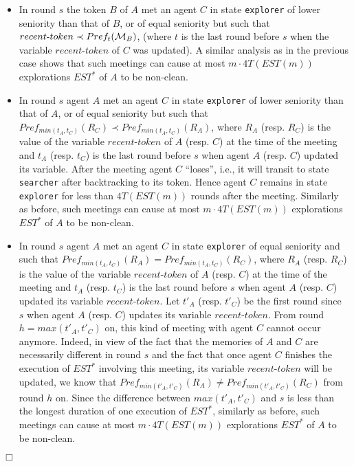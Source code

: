 \documentclass[11pt]{article}
\newcommand{\qed}{\hfill $\Box$ \bigbreak}
\newenvironment{proof}{\noindent {\bf Proof.}}{\qed}
\newcommand{\cM}{{\cal M}}
\begin{document}
\begin{proof}
\begin{itemize}
   
     \item
     {In round $s$} the token $B$ of $A$ met an agent $C$  in state {\tt explorer} of lower seniority than that of $B$, or of equal seniority but such that $recent\mbox{-}token \prec Pref_t(\cM_B)$, {(where $t$ is the last round before $s$ when the variable $recent$-$token$ of $C$ was updated)}.
     A similar analysis as in the previous case shows that such meetings {can cause at most $m \cdot 4T(EST(m))$ explorations $EST^*$ of $A$ to be non-clean.}  
     \item
    {In round $s$ agent $A$ met an agent $C$ in state {\tt explorer} of lower seniority than that of $A$, or of equal seniority but such that $Pref_{min(t_A,t_C)}(R_C) \prec Pref_{min(t_A,t_C)}(R_A)$, where $R_A$ (resp. $R_C$) is the value of the variable $recent$-$token$ of $A$ (resp. $C$) at the time of the meeting and $t_A$ (resp. $t_C$) is the last round before $s$ when agent $A$ (resp. $C$) updated its variable. After the meeting agent $C$ ``loses'', i.e., it will transit to state {\tt searcher} after backtracking
     to its token. Hence agent $C$ remains in state {\tt explorer} for less than $4T(EST(m))$ rounds after the meeting. Similarly as before, such meetings can cause at most $m \cdot 4T(EST(m))$  explorations $EST^*$ of $A$ to be non-clean.}

\item
    {In round $s$ agent $A$ met an agent $C$ in state {\tt explorer} of equal seniority and such that $Pref_{min(t_A,t_C)}(R_A) = Pref_{min(t_A,t_C)}(R_C)$, where $R_A$ (resp. $R_C$) is the value of the variable $recent$-$token$ of $A$ (resp. $C$) at the time of the meeting and $t_A$ (resp. $t_C$) is the last round before $s$ when agent $A$ (resp. $C$) updated its variable $recent$-$token$. Let $t'_A$ (resp. $t'_C$) be the first round since $s$ when agent $A$ (resp. $C$) updates its variable $recent$-$token$. From round $h=max(t'_A,t'_C)$ on, this kind of meeting with agent $C$ cannot occur anymore. Indeed, in view of the fact that the memories of $A$ and $C$ are necessarily different in round $s$ and the fact that once agent $C$ finishes the execution of $EST^*$ involving this meeting, its variable $recent$-$token$ will be updated, we know that  $Pref_{min(t'_A,t'_C)}(R_A) \ne Pref_{min(t'_A,t'_C)}(R_C)$ from round $h$ on. Since the difference between $max(t'_A,t'_C)$ and $s$ is less than the longest duration of one execution of $EST^*$, similarly as before, such meetings can cause at most $m \cdot 4T(EST(m))$  explorations $EST^*$ of $A$ to be non-clean.}


\end{itemize}
\end{proof}
\end{document}
